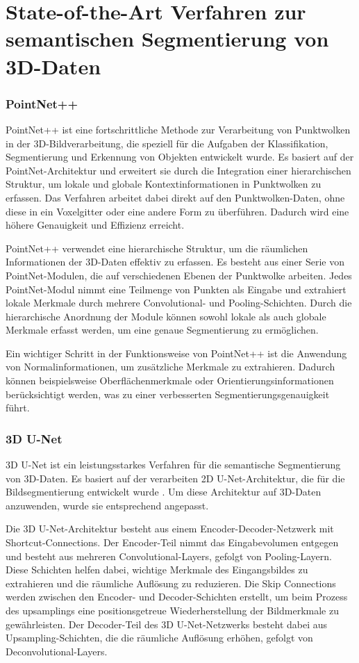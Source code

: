 \chapter{State-of-the-Art Verfahren zur semantischen Segmentierung von 3D-Daten}
\subsection{PointNet++}
PointNet++ ist eine fortschrittliche Methode zur Verarbeitung von Punktwolken
in der 3D-Bildverarbeitung, die speziell für die Aufgaben der Klassifikation,
Segmentierung und Erkennung von Objekten entwickelt wurde. Es basiert auf der
PointNet-Architektur und erweitert sie durch die Integration einer
hierarchischen Struktur, um lokale und globale Kontextinformationen in
Punktwolken zu erfassen. Das Verfahren arbeitet dabei direkt auf den
Punktwolken-Daten, ohne diese in ein Voxelgitter oder eine andere Form zu
überführen. Dadurch wird eine höhere Genauigkeit und Effizienz erreicht.

PointNet++ verwendet eine hierarchische Struktur, um die räumlichen
Informationen der 3D-Daten effektiv zu erfassen. Es besteht aus einer Serie von
PointNet-Modulen, die auf verschiedenen Ebenen der Punktwolke arbeiten. Jedes
PointNet-Modul nimmt eine Teilmenge von Punkten als Eingabe und extrahiert
lokale Merkmale durch mehrere Convolutional- und Pooling-Schichten. Durch die
hierarchische Anordnung der Module können sowohl lokale als auch globale
Merkmale erfasst werden, um eine genaue Segmentierung zu ermöglichen.

Ein wichtiger Schritt in der Funktionsweise von PointNet++ ist die Anwendung
von Normalinformationen, um zusätzliche Merkmale zu extrahieren.
Dadurch können beispielsweise Oberflächenmerkmale oder
Orientierungsinformationen berücksichtigt werden, was zu einer verbesserten
Segmentierungsgenauigkeit führt. \cite{NIPS2017_d8bf84be} 

\subsection{3D U-Net}

3D U-Net ist ein leistungsstarkes Verfahren für die semantische Segmentierung von 3D-Daten.
Es basiert auf der verarbeiten 2D U-Net-Architektur, die für die Bildsegmentierung entwickelt wurde \cite{ronneberger2015unet}.
Um diese Architektur auf 3D-Daten anzuwenden, wurde sie entsprechend angepasst.

Die 3D U-Net-Architektur besteht aus einem Encoder-Decoder-Netzwerk mit
Shortcut-Connections. Der Encoder-Teil nimmt das Eingabevolumen entgegen und
besteht aus mehreren Convolutional-Layers, gefolgt von Pooling-Layern. Diese
Schichten helfen dabei, wichtige Merkmale des Eingangsbildes zu extrahieren und
die räumliche Auflösung zu reduzieren. Die Skip Connections werden zwischen den
Encoder- und Decoder-Schichten erstellt, um beim Prozess des upsamplings eine
positionsgetreue Wiederherstellung der Bildmerkmale zu gewährleisten. Der
Decoder-Teil des 3D U-Net-Netzwerks besteht dabei aus Upsampling-Schichten, die
die räumliche Auflösung erhöhen, gefolgt von Deconvolutional-Layers.

